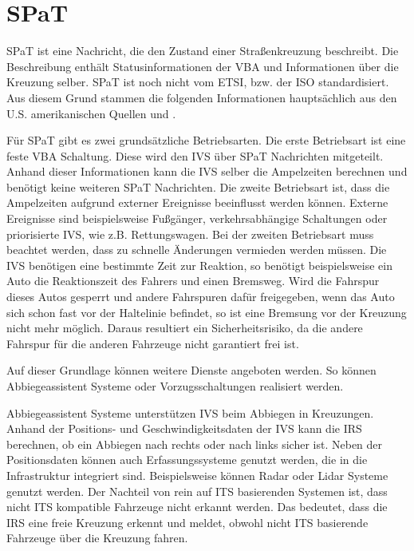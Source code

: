 \section{SPaT\label{sec:spat}}
\ac{SPaT} ist eine Nachricht, die den Zustand einer Straßenkreuzung beschreibt. Die Beschreibung enthält Statusinformationen der \ac{VBA} und Informationen über die Kreuzung selber. \ac{SPaT} ist noch nicht vom \ac{ETSI}, bzw. der \ac{ISO} standardisiert. Aus diesem Grund stammen die folgenden Informationen hauptsächlich aus den U.S. amerikanischen Quellen \cite{usSpat} und \cite{usCaliforniaSpat}. 

Für \ac{SPaT} gibt es zwei grundsätzliche Betriebsarten. Die erste Betriebsart ist eine feste \ac{VBA} Schaltung. Diese wird den \ac{IVS} über \ac{SPaT} Nachrichten mitgeteilt. Anhand dieser Informationen kann die \ac{IVS} selber die Ampelzeiten berechnen und benötigt keine  weiteren \ac{SPaT} Nachrichten. Die zweite Betriebsart ist, dass die Ampelzeiten aufgrund externer Ereignisse beeinflusst werden können. Externe Ereignisse sind beispielsweise Fußgänger, verkehrsabhängige Schaltungen oder priorisierte \ac{IVS}, wie z.B. Rettungswagen. Bei der zweiten Betriebsart muss beachtet werden, dass zu schnelle Änderungen vermieden werden müssen. Die \ac{IVS} benötigen eine bestimmte Zeit zur Reaktion, so benötigt beispielsweise ein Auto die Reaktionszeit des Fahrers und einen Bremsweg. Wird die Fahrspur dieses Autos gesperrt und andere Fahrspuren dafür freigegeben, wenn das Auto sich schon fast vor der Haltelinie befindet, so ist eine Bremsung vor der Kreuzung nicht mehr möglich. Daraus resultiert ein Sicherheitsrisiko, da die andere Fahrspur für die anderen Fahrzeuge nicht garantiert frei ist. 

Auf dieser Grundlage können weitere Dienste angeboten werden. So können Abbiegeassistent Systeme oder Vorzugsschaltungen realisiert werden. 

 Abbiegeassistent Systeme unterstützen \ac{IVS} beim Abbiegen in Kreuzungen. Anhand der Positions- und Geschwindigkeitsdaten der \ac{IVS} kann die \ac{IRS} berechnen, ob ein Abbiegen nach rechts oder nach links sicher ist. Neben der Positionsdaten können auch Erfassungssysteme genutzt werden, die in die Infrastruktur integriert sind. Beispielsweise können \ac{Radar} oder \ac{Lidar} Systeme genutzt werden. Der Nachteil von rein auf \ac{ITS} basierenden Systemen ist, dass nicht \ac{ITS} kompatible Fahrzeuge nicht erkannt werden. Das bedeutet, dass die \ac{IRS} eine freie Kreuzung erkennt und meldet, obwohl nicht \ac{ITS} basierende Fahrzeuge über die Kreuzung fahren. 
 

